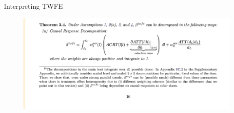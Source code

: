 \documentclass{beamer}
\begin{document}
\begin{frame}{Interpreting TWFE}

\begin{figure}
\begin{center}
             \includegraphics[scale=0.55]{./lecture_includes/continuous9.png}
\end{center}
\end{figure}

\end{frame}
\end{document}

